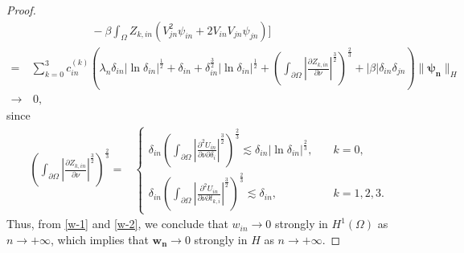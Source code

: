 \documentclass[10pt,a4paper]{amsart}
\begin{document}
\begin{proof}
\begin{align}
  &\qquad\,\quad\,\qquad-\beta\displaystyle\int_{\Omega}Z_{k,in}\left(V_{jn}^2\psi_{in}+2V_{in}V_{jn}\psi_{jn}\right)\Bigg]\nonumber\\
  =&\sum_{k=0}^3c_{in}^{(k)}\left(\lambda_n\delta_{in}|\ln{\delta_{in}}|^{\frac{1}{2}}+\delta_{in}+\delta^{\frac{3}{2}}_{in}|\ln{\delta_{in}}|^{\frac{1}{2}}+\left(\displaystyle\int_{\partial\Omega}\left|\frac{\partial Z_{k,in}}{\partial \nu}\right|^{\frac{3}{2}}\right)^{\frac{2}{3}}+{|\beta|\delta_{in}\delta_{jn}}\right)\|\bm{\psi_{n}}\|_{H}\nonumber\\ 
  \longrightarrow&\, 0,
\end{align}
since \begin{align*}
\left(\displaystyle\int_{\partial\Omega}\left|\frac{\partial Z_{k,in}}{\partial \nu}\right|^{\frac{3}{2}}\right)^{\frac{2}{3}}=&\begin{cases}
\delta_{in}\left(\displaystyle\int_{\partial\Omega}\left|\frac{\partial^{2} U_{in}}{\partial\nu\partial \delta_i}\right|^{\frac{3}{2}}\right)^{\frac{2}{3}}\lesssim \delta_{in}|\ln{\delta_{in}}|^{\frac{2}{3}},\quad &k=0,\\
\delta_{in}\left(\displaystyle\int_{\partial\Omega}\left|\frac{\partial^{2} U_{in}}{\partial\nu\partial t_{k,i}}\right|^{\frac{3}{2}}\right)^{\frac{2}{3}}\lesssim \delta_{in},\quad &k=1,2,3.
    \end{cases}
\end{align*}
Thus, from \eqref{w-1} and \eqref{w-2}, we conclude that $w_{{in}} \rightarrow 0$ strongly in $H^{1}(\Omega)$ as $n \rightarrow+\infty$, which implies that $\bm{w_{{n}}} \rightarrow 0$ strongly in $H$ as $n \rightarrow+\infty$.
\medskip


\end{proof}
\end{document}
